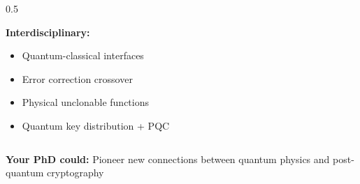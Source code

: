 \documentclass[aspectratio=169,10pt]{beamer}
\newcommand{\teaching}[1]{}
\theoremstyle{plain}
\begin{document}
\begin{frame}
\begin{columns}
\begin{column}{0.5\textwidth}
      \vspace{0.3cm}
      
      \textbf{Interdisciplinary:}
      \begin{itemize}
        \item Quantum-classical interfaces
        \item Error correction crossover
        \item Physical unclonable functions
        \item Quantum key distribution + PQC
      \end{itemize}
    \end{column}
  \end{columns}
  
  \vspace{0.5cm}
  
  \begin{blueBox}
    \textbf{Your PhD could:} Pioneer new connections between quantum physics and post-quantum cryptography
  \end{blueBox}
  
  \teaching{Inspire research directions}
\end{frame}
\end{document}

